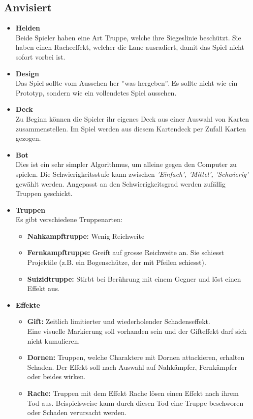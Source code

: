 \subsection{Anvisiert}
\begin{itemize}
    \item \textbf{Helden} \\
        Beide Spieler haben eine Art Truppe, welche ihre Siegeslinie beschützt. Sie haben einen Racheeffekt, welcher die
        Lane ausradiert, damit das Spiel nicht sofort vorbei ist.
    \item \textbf{Design} \\
        Das Spiel sollte vom Aussehen her ''was hergeben''. Es sollte nicht wie ein Prototyp, sondern wie ein 
        vollendetes Spiel aussehen. 
    \item \textbf{Deck} \\
        Zu Beginn können die Spieler ihr eigenes Deck aus einer Auswahl von Karten zusammenstellen. Im Spiel werden aus diesem Kartendeck per Zufall Karten gezogen.
    \item \textbf{Bot} \\
        Dies ist ein sehr simpler Algorithmus, um alleine gegen den Computer zu spielen. Die Schwierigkeitsstufe kann zwischen \textit{'Einfach', 'Mittel', 'Schwierig'} gewählt werden.
        Angepasst an den Schwierigkeitsgrad werden zufällig Truppen geschickt.
    \item \textbf{Truppen}\\
    Es gibt verschiedene Truppenarten:
    \begin{itemize}
        \item \textbf{Nahkampftruppe:}
            Wenig Reichweite
        \item \textbf{Fernkampftruppe:}
            Greift auf grosse Reichweite an. Sie schiesst Projektile (z.B. ein Bogenschütze, der mit Pfeilen schiesst).
        \item \textbf{Suizidtruppe:}
            Stirbt bei Berührung mit einem Gegner und löst einen Effekt aus.
    \end{itemize}
    \item \textbf{Effekte}
    \begin{itemize}
        \item \textbf{Gift:}
            Zeitlich limitierter und wiederholender Schadenseffekt. \\Eine visuelle Markierung soll vorhanden sein
            und der Gifteffekt darf sich nicht kumulieren.
        \item \textbf{Dornen:}
            Truppen, welche Charaktere mit Dornen attackieren, erhalten Schaden. Der Effekt soll nach Auswahl auf Nahkämpfer,
            Fernkämpfer oder beides wirken.
        \item \textbf{Rache:}
            Truppen mit dem Effekt Rache lösen einen Effekt nach ihrem Tod aus. Beispielsweise kann durch diesen Tod eine Truppe beschworen oder Schaden verursacht werden.
    \end{itemize}
\end{itemize}

